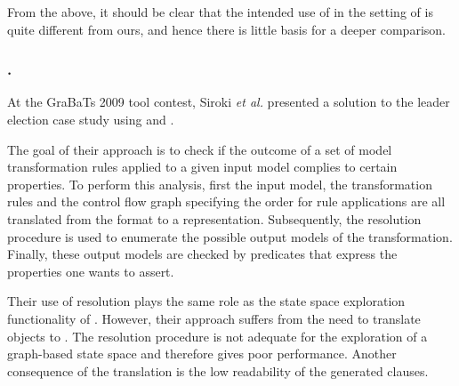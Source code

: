 From the above, it should be clear that the intended use of \Prolog in the
setting of \VIATRA is quite different from ours, and hence there is little
basis for a deeper comparison.

\subsubsection{\VMTS.}

At the GraBaTs 2009 tool contest, Siroki {\it et al.} \cite{VMTS-GRABATS}
presented a solution to the leader election case study using \VMTS and \Prolog.

The goal of their approach is to check if the outcome of a set of model
transformation rules applied to a given input model complies to certain
properties. To perform this analysis, first the input model, the transformation
rules and the control flow graph specifying the order for rule applications are
all translated from the \VMTS format to a \Prolog representation. Subsequently,
the \Prolog resolution procedure is used to enumerate the possible output
models of the transformation. Finally, these output models are checked by
\Prolog predicates that express the properties one wants to assert.

Their use of \Prolog resolution plays the same role as the state space
exploration functionality of \GROOVE. However, their approach suffers from the
need to translate \VMTS objects to \Prolog. The \Prolog resolution procedure is
not adequate for the exploration of a graph-based state space and therefore
gives poor performance. Another consequence of the translation is the low
readability of the generated \Prolog clauses.

%
